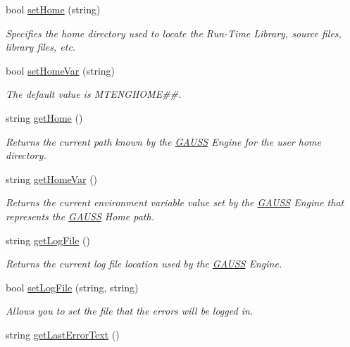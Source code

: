 \begin{DoxyCompactItemize}
bool \hyperlink{class_g_a_u_s_s_af1f5a5df0c904bd713c4edea74606e55}{set\-Home} (string)
\begin{DoxyCompactList}\small\item\em Specifies the home directory used to locate the Run-\/\-Time Library, source files, library files, etc. \end{DoxyCompactList}\item 
bool \hyperlink{class_g_a_u_s_s_a61b2ebc8c6ac5694e8cc33cb7726cbe3}{set\-Home\-Var} (string)
\begin{DoxyCompactList}\small\item\em The default value is {\ttfamily M\-T\-E\-N\-G\-H\-O\-M\-E\#\#}. \end{DoxyCompactList}\item 
string \hyperlink{class_g_a_u_s_s_adfe744665cc891f5288d5523083d2a2c}{get\-Home} ()
\begin{DoxyCompactList}\small\item\em Returns the current path known by the \hyperlink{class_g_a_u_s_s}{G\-A\-U\-S\-S} Engine for the user home directory. \end{DoxyCompactList}\item 
string \hyperlink{class_g_a_u_s_s_abb13d8fd5b2abd2844e48279621204e6}{get\-Home\-Var} ()
\begin{DoxyCompactList}\small\item\em Returns the current environment variable value set by the \hyperlink{class_g_a_u_s_s}{G\-A\-U\-S\-S} Engine that represents the \hyperlink{class_g_a_u_s_s}{G\-A\-U\-S\-S} Home path. \end{DoxyCompactList}\item 
string \hyperlink{class_g_a_u_s_s_ad9c991ab9fd7dea25a865eb1deae9b4c}{get\-Log\-File} ()
\begin{DoxyCompactList}\small\item\em Returns the current log file location used by the \hyperlink{class_g_a_u_s_s}{G\-A\-U\-S\-S} Engine. \end{DoxyCompactList}\item 
bool \hyperlink{class_g_a_u_s_s_a59f4b84f55f76701ca9deb7be3f9f0fe}{set\-Log\-File} (string, string)
\begin{DoxyCompactList}\small\item\em Allows you to set the file that the errors will be logged in. \end{DoxyCompactList}\item 
string \hyperlink{class_g_a_u_s_s_a048aa287aa5d82638aff68f4d4cbec28}{get\-Last\-Error\-Text} ()

\end{DoxyCompactItemize}
